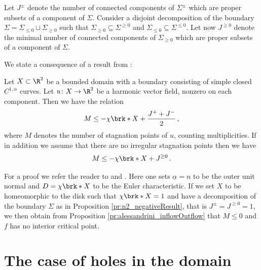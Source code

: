 \begin{definition}
Let $J^\pm$ denote the number of connected components of $\Sigma^\pm$ which are proper
subsets of a component of $\Sigma$.
Consider a disjoint decomposition of the boundary $\Sigma=\Sigma_{\leq0}\sqcup\Sigma_{\geq0}$ such
that $\Sigma_{\geq0}\subseteq\Sigma^{\geq0}$ and $\Sigma_{\leq0}\subseteq\Sigma^{\leq0}$.
Let now $J^{\geq0}$ denote the minimal number of connected components of $\Sigma_{\geq0}$ 
which are proper subsets of a component of $\Sigma$.
\end{definition}

We state a consequence of a result from \cite[Theorem 2.1 and 2.2]{Alessandrini1992}:
\begin{proposition}\label{pr:alessandrini_inflowOutflow}
  Let $X\subset\R^2$ be a bounded domain with a boundary consisting of simple closed $C^{1,\alpha}$ curves.
  Let $u\colon X\to \R^2$ be a harmonic vector field, nonzero on each component.
  Then we have the relation
  \begin{align}
    M\leq -\chi\brk*{X}+\frac{J^++J^-}{2}\label{eq:n2_Alessandrini1}\,,
  \end{align}
  where $M$ denotes the number of stagnation points of $u$, counting multiplicities.
  If in addition we assume that there are no irregular stagnation points then we have
  \begin{align}
    M\leq -\chi\brk*{X}+J^{\geq0}\,.\label{eq:n2_Alessandrini2}
  \end{align}
\end{proposition}
  For a proof we refer the reader to \cite[Theorem 2.1]{Alessandrini1992} and \cite[Theorem 2.2]{Alessandrini1992}. Here one sets $\underline{\alpha}=n$ to be the outer unit normal and $D=\chi\brk*{X}$
  to be the Euler characteristic.
% 
If we set $X$ to be homeomorphic to the disk such that $\chi\brk*{X}=1$ and have a
decomposition of the boundary $\Sigma$ as in Proposition \ref{pr:n2_negativeResult}, that is $J^\pm=J^{\geq0}=1$,
we then obtain from Proposition \ref{pr:alessandrini_inflowOutflow} that $M\leq0$
and $f$ has no interior critical point.

\section{The case of holes in the domain}

